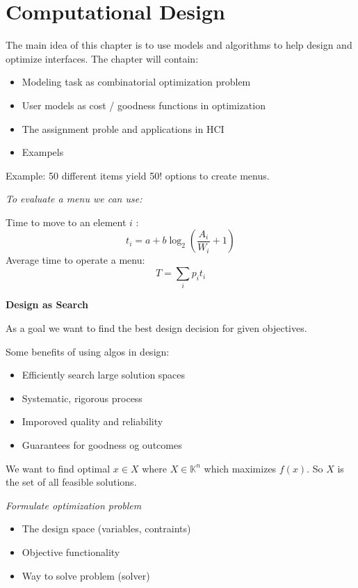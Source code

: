 \section{Computational Design}

The main idea of this chapter is to use models and algorithms to help design and optimize interfaces. The chapter will contain: 

\begin{itemize}[itemsep=-5pt, topsep=0pt, leftmargin=*]
	\item Modeling task as combinatorial optimization problem
	\item User models as cost / goodness functions in optimization
	\item The assignment proble and applications in HCI
	\item Exampels
\end{itemize}

Example: 50 different items yield 50! options to create menus. 

\smallskip

\textit{To evaluate a menu we can use:} \medskip

Time to move to an element $i$ :
$$t_i = a + b \log_2 \left( \frac{A_i}{W_i} + 1 \right)$$
Average time to operate a menu:
$$T = \sum_{i} p_i t_i$$

\textbf{Design as Search}

As a goal we want to find the best design decision for given objectives. \medskip

Some benefits of using algos in design: 


\begin{itemize}[itemsep=-5pt, topsep=0pt, leftmargin=*]
	\item Efficiently search large solution spaces
	\item Systematic, rigorous process
	\item Imporoved quality and reliability
	\item Guarantees for goodness og outcomes
\end{itemize}

We want to find optimal $x \in X$ where $X \in \mathbb{K}^n$ which maximizes $f(x)$. So $X$ is the set of all feasible solutions. \medskip

\textit{Formulate optimization problem}
 \begin{multicols}{2}
    \begin{itemize}[itemsep=-5pt, topsep=0pt, leftmargin=*]
        \item The design space (variables, contraints)
        \item Objective functionality
        \item  Way to solve problem (solver)
    \end{itemize}
 \end{multicols}
    

